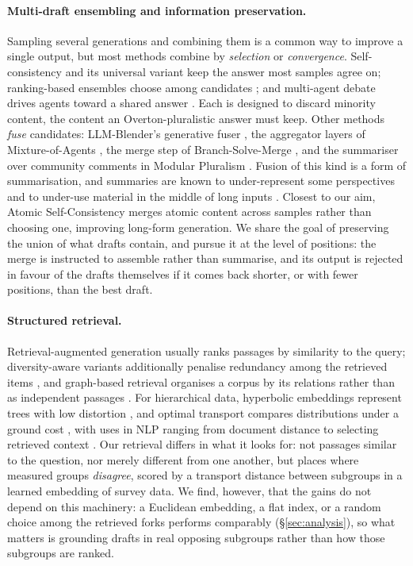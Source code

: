\documentclass[11pt]{article}
\begin{document}
{\begin{itemize}
    \paragraph{Multi-draft ensembling and information preservation.}
Sampling several generations and combining them is a common way to improve a
single output, but most methods combine by \emph{selection} or
\emph{convergence}. Self-consistency \citep{wang2023selfconsistency} and its
universal variant \citep{chen2023universal} keep the answer most samples agree
on; ranking-based ensembles choose among candidates \citep{jiang2023llmblender};
and multi-agent debate drives agents toward a shared answer \citep{du2024debate}.
Each is designed to discard minority content, the content an Overton-pluralistic
answer must keep. Other methods \emph{fuse} candidates: LLM-Blender's generative
fuser \citep{jiang2023llmblender}, the aggregator layers of Mixture-of-Agents
\citep{wang2024mixture}, the merge step of Branch-Solve-Merge
\citep{saha2024bsm}, and the summariser over community comments in Modular
Pluralism \citep{feng-etal-2024-modular}. Fusion of this kind is a form of
summarisation, and summaries are known to under-represent some perspectives
\citep{zhang2024fair} and to under-use material in the middle of long inputs
\citep{liu2024lost}. Closest to our aim, Atomic Self-Consistency
\citep{thirukovalluru2024asc} merges atomic content across samples rather than
choosing one, improving long-form generation. We share the goal of preserving
the union of what drafts contain, and pursue it at the level of positions: the
merge is instructed to assemble rather than summarise, and its output is
rejected in favour of the drafts themselves if it comes back shorter, or with
fewer positions, than the best draft.

\end{itemize}
}

\paragraph{Structured retrieval.}
Retrieval-augmented generation usually ranks passages by similarity to the
query; diversity-aware variants additionally penalise redundancy among the
retrieved items \citep{carbonell1998mmr}, and graph-based retrieval organises
a corpus by its relations rather than as independent passages
\citep{edge2024graphrag}. For hierarchical data, hyperbolic embeddings
represent trees with low distortion \citep{nickel2017poincare,
chami2020trees}, and optimal transport compares distributions under a ground
cost \citep{peyre2019computational}, with uses in NLP ranging from document
distance \citep{kusner2015word} to selecting retrieved context
\citep{zhang2026georag}. Our retrieval differs in what it looks for: not
passages similar to the question, nor merely different from one another, but
places where measured groups \emph{disagree}, scored by a transport distance
between subgroups in a learned embedding of survey data. We find, however,
that the gains do not depend on this machinery: a Euclidean embedding, a flat
index, or a random choice among the retrieved forks performs comparably
(\S\ref{sec:analysis}), so what matters is grounding drafts in real opposing
subgroups rather than how those subgroups are ranked.
\end{document}
